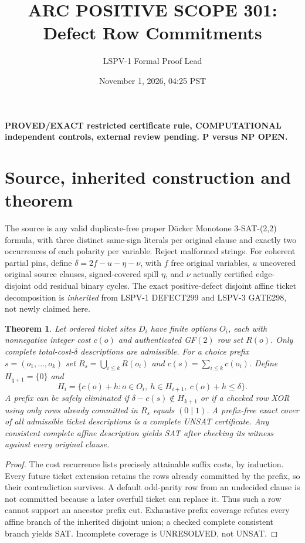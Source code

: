 \documentclass[11pt]{article}
\title{ARC POSITIVE SCOPE 301: Defect Row Commitments}
\author{LSPV-1 Formal Proof Lead}
\date{November 1, 2026, 04:25 PST}
\newtheorem{theorem}{Theorem}
\begin{document}
\maketitle
\noindent\textbf{PROVED/EXACT restricted certificate rule, COMPUTATIONAL independent controls, external review pending. P versus NP OPEN.}
\section{Source, inherited construction and theorem}
The source is any valid duplicate-free proper D\"ocker Monotone 3-SAT-(2,2) formula, with three distinct same-sign literals per original clause and exactly two occurrences of each polarity per variable. Reject malformed strings. For coherent partial pins, define $\delta=2f-u-\eta-\nu$, with $f$ free original variables, $u$ uncovered original source clauses, signed-covered spill $\eta$, and $\nu$ actually certified edge-disjoint odd residual binary cycles. The exact positive-defect disjoint affine ticket decomposition is \emph{inherited} from LSPV-1 DEFECT299 and LSPV-3 GATE298, not newly claimed here.
\begin{theorem}
Let ordered ticket sites $D_i$ have finite options $O_i$, each with nonnegative integer cost $c(o)$ and authenticated GF$(2)$ row set $R(o)$. Only complete total-cost-$\delta$ descriptions are admissible. For a choice prefix $s=(o_1,\ldots,o_k)$ set $R_s=\bigcup_{i\le k}R(o_i)$ and $c(s)=\sum_{i\le k}c(o_i)$. Define $H_{q+1}=\{0\}$ and
\[
H_i=\{c(o)+h:o\in O_i,\ h\in H_{i+1},\ c(o)+h\le\delta\}.
\]
A prefix can be safely eliminated if $\delta-c(s)\notin H_{k+1}$ or if a checked row XOR using \emph{only rows already committed in $R_s$} equals $(0\mid1)$. A prefix-free exact cover of all admissible ticket descriptions is a complete UNSAT certificate. Any consistent complete affine description yields SAT after checking its witness against every original clause.
\end{theorem}
\begin{proof}
The cost recurrence lists precisely attainable suffix costs, by induction. Every future ticket extension retains the rows already committed by the prefix, so their contradiction survives. A default odd-parity row from an undecided clause is not committed because a later overfull ticket can replace it. Thus such a row cannot support an ancestor prefix cut. Exhaustive prefix coverage refutes every affine branch of the inherited disjoint union; a checked complete consistent branch yields SAT. Incomplete coverage is UNRESOLVED, not UNSAT.
\end{proof}
\end{document}
